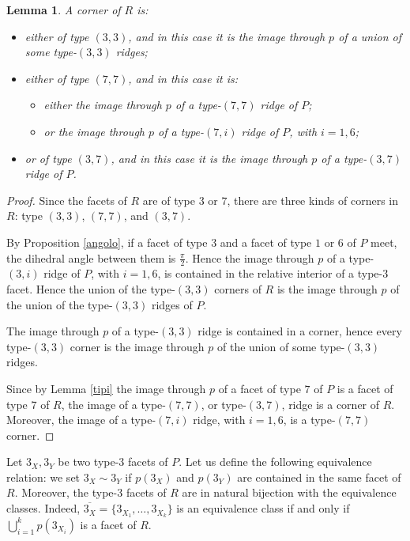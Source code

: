 \documentclass{amsart}
\newtheorem{lemma}{Lemma}[section]
\theoremstyle{definition}
\theoremstyle{remark}
\begin{document}
\begin{lemma}
\label{corner}
    A corner of $R$ is:
    \begin{itemize}
        \item either of type $(3,3)$, and in this case it is the image through $p$ of a union of some type-$(3,3)$ ridges;
        \item either of type $(7,7)$, and in this case it is:
        \begin{itemize}
            \item either the image through $p$ of a type-$(7,7)$ ridge of $P$;
            \item or the image through $p$ of a type-$(7,i)$ ridge of $P$, with $i=1,6$;
        \end{itemize}
        
        \item or of type $(3,7)$, and in this case it is the image through $p$ of a type-$(3,7)$ ridge of $P$.
    \end{itemize}
\end{lemma}
\begin{proof}
    Since the facets of $R$ are of type $3$ or $7$, there are three kinds of corners in $R$: type $(3,3)$, $(7,7)$, and $(3,7)$.

    By Proposition \ref{angolo}, if a facet of type $3$ and a facet of type $1$ or $6$ of $P$ meet, the dihedral angle between them is $\frac{\pi}{2}$. Hence the image through $p$ of a type-$(3,i)$ ridge of $P$, with $i=1,6$, is contained in the relative interior of a type-$3$ facet. Hence the union of the type-$(3,3)$ corners of $R$ is the image through $p$ of the union of the type-$(3,3)$ ridges of $P$.

    The image through $p$ of a type-$(3,3)$ ridge is contained in a corner, hence every type-$(3,3)$ corner is the image through $p$ of the union of some type-$(3,3)$ ridges.
    

    Since by Lemma \ref{tipi} the image through $p$ of a facet of type $7$ of $P$ is a facet of type $7$ of $R$, the image of a type-$(7,7)$, or type-$(3,7)$, ridge is a corner of $R$. Moreover,  the image of a type-$(7,i)$ ridge, with $i=1,6$, is a type-$(7,7)$ corner.
\end{proof}

Let $3_X,3_Y$ be two type-$3$ facets of $P$. Let us define the following equivalence relation: we set $3_X \sim 3_Y$ if $p(3_X)$ and $p(3_Y)$ are contained in the same facet of $R$.
Moreover, the type-$3$ facets of $R$ are in natural bijection with the equivalence classes. Indeed,  $\overline{3_X}=\{3_{X_1},\dots,3_{X_k}\}$ is an equivalence class if and only if $\bigcup_{i=1}^k p(3_{X_i})$ is a facet of $R$.
\end{document}
